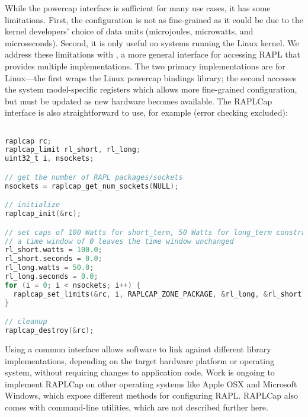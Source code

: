 While the powercap interface is sufficient for many use cases, it has some limitations.
First, the configuration is not as fine-grained as it could be due to the kernel developers' choice of data units (microjoules, microwatts, and microseconds).
Second, it is only useful on systems running the Linux kernel.
We address these limitations with , a more general interface for accessing RAPL that provides multiple implementations.
The two primary implementations are for Linux---the first wraps the Linux powercap bindings library; the second accesses the system model-specific registers which allows more fine-grained configuration, but must be updated as new hardware becomes available.
The RAPLCap interface is also straightforward to use, for example (error checking excluded):
%
\begin{lstlisting}[language=C,%
  caption={Setting RAPL power caps with RAPLCap.},%
  morekeywords={uint32_t},%
  label={lst:raplcap-example}]%

raplcap rc;
raplcap_limit rl_short, rl_long;
uint32_t i, nsockets;

// get the number of RAPL packages/sockets
nsockets = raplcap_get_num_sockets(NULL);

// initialize
raplcap_init(&rc);

// set caps of 100 Watts for short_term, 50 Watts for long_term constraints on each socket
// a time window of 0 leaves the time window unchanged
rl_short.watts = 100.0;
rl_short.seconds = 0.0;
rl_long.watts = 50.0;
rl_long.seconds = 0.0;
for (i = 0; i < nsockets; i++) {
  raplcap_set_limits(&rc, i, RAPLCAP_ZONE_PACKAGE, &rl_long, &rl_short);
}

// cleanup
raplcap_destroy(&rc);
\end{lstlisting}
Using a common interface allows software to link against different library implementations, depending on the target hardware platform or operating system, without requiring changes to application code.
Work is ongoing to implement RAPLCap on other operating systems like Apple OSX and Microsoft Windows, which expose different methods for configuring RAPL.
RAPLCap also comes with command-line utilities, which are not described further here.
